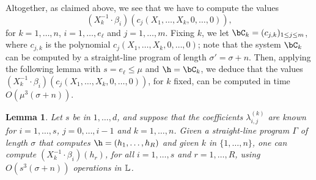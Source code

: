 \documentclass[12pt]{article}
\newtheorem{lemma}[definition]{Lemma}
\begin{document}
Altogether, as claimed above, we see that we have to compute the
values
$$(X_k^{-1} \cdot \beta_i)(c_j(X_1,\dots,X_k,0,\dots,0)),$$ for
$k=1,\dots,n$, $i=1,\dots,e_\ell$ and $j=1,\dots,m$.  Fixing $k$, we
let $\bC_k = (c_{j,k})_{1 \le j \le m}$, where $c_{j,k}$ is the
polynomial $c_j(X_1,\dots,X_k,0,\dots,0)$; note that the system
$\bC_k$ can be computed by a straight-line program of length
$\sigma'= \sigma+n$. Then, applying the following lemma with
$s=e_\ell \le \mu$ and $\h = \bC_k$, we deduce that the values
$(X_k^{-1} \cdot \beta_i)(c_j(X_1,\dots,X_k,0,\dots,0))$, for $k$
fixed, can be computed in time $O(\mu^3 (\sigma+n))$.


\begin{lemma}
  Let $s$ be in $1,\dots,d$, and suppose that the coefficients
  $\lambda^{(k)}_{i,j}$ are known for $i=1,\dots,s$, $j=0,\dots,i-1$
  and $k=1,\dots,n$. Given a straight-line program $\Gamma$ of length
  $\sigma$ that computes $\h=(h_1,\dots,h_R)$ and given $k$ in
  $\{1,\dots,n\}$, one can compute $(X_k^{-1}\cdot \beta_i)(h_r)$, for
  all $i=1,\dots,s$ and $r=1,\dots,R$, using $O(s^3 (\sigma+n))$
  operations in $\mathbb{L}$.
\end{lemma}
\end{document}
